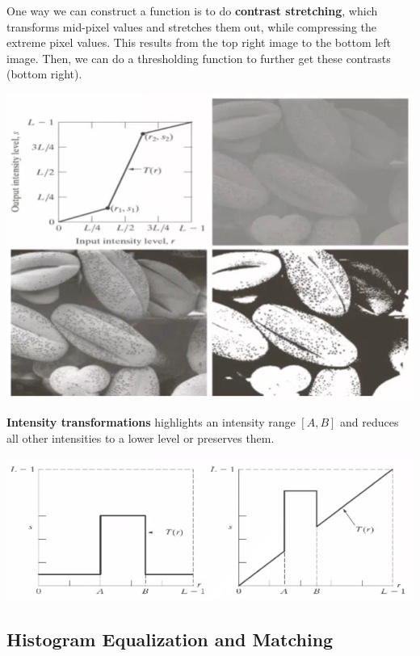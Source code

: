 \documentclass{article}
\begin{document}
    \begin{example}
    One way we can construct a function is to do \textbf{contrast stretching}, which transforms mid-pixel values and stretches them out, while compressing the extreme pixel values. This results from the top right image to the bottom left image. Then, we can do a thresholding function to further get these contrasts (bottom right). 
    \begin{center}
        \includegraphics[scale=0.3]{img/contrast_stretching.png}
    \end{center}
    \end{example}

    \begin{example}
    \textbf{Intensity transformations} highlights an intensity range $[A, B]$ and reduces all other intensities to a lower level or preserves them. 
    \begin{center}
        \includegraphics[scale=0.3]{img/intensity_transformations.png}
    \end{center}
    \end{example}

  \subsection{Histogram Equalization and Matching}
\end{document}
